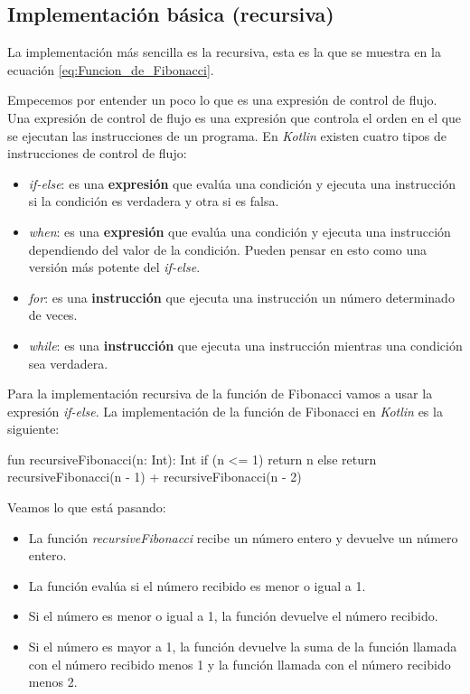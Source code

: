 
\subsection{Implementación básica (recursiva)}
  La implementación más sencilla es la recursiva, esta es la que se muestra en la ecuación
  \ref{eq:Funcion_de_Fibonacci}.

  Empecemos por entender un poco lo que es una expresión de control de flujo.
  Una expresión de control de flujo es una expresión que controla el orden en el que se ejecutan
  las instrucciones de un programa.
  En \textit{Kotlin} existen cuatro tipos de instrucciones de control de flujo:

  \begin{itemize}
    \item \textit{if-else}: es una \textbf{expresión} que evalúa una condición y ejecuta una instrucción
      si la condición es verdadera y otra si es falsa.
    \item \textit{when}: es una \textbf{expresión} que evalúa una condición y ejecuta una instrucción
      dependiendo del valor de la condición.
      Pueden pensar en esto como una versión más potente del \textit{if-else}.
    \item \textit{for}: es una \textbf{instrucción} que ejecuta una instrucción un número determinado de
      veces.
    \item \textit{while}: es una \textbf{instrucción} que ejecuta una instrucción mientras una condición
      sea verdadera.
  \end{itemize}

  Para la implementación recursiva de la función de Fibonacci vamos a usar la expresión 
  \textit{if-else}.
  La implementación de la función de Fibonacci en \textit{Kotlin} es la siguiente:

  \begin{kotlin}
    fun recursiveFibonacci(n: Int): Int {
      if (n <= 1) {
        return n
      } else {
        return recursiveFibonacci(n - 1) + recursiveFibonacci(n - 2)
      }
    }
  \end{kotlin}

  Veamos lo que está pasando:

  \begin{itemize}
    \item La función \textit{recursiveFibonacci} recibe un número entero y devuelve un
      número entero.
    \item La función evalúa si el número recibido es menor o igual a 1.
    \item Si el número es menor o igual a 1, la función devuelve el número recibido.
    \item Si el número es mayor a 1, la función devuelve la suma de la función llamada con el
      número recibido menos 1 y la función llamada con el número recibido menos 2.
  \end{itemize}

